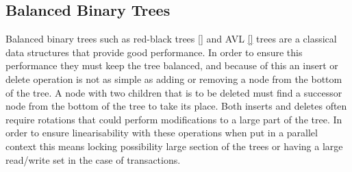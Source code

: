 \documentclass[10pt]{sigplanconf}
\begin{document}
%
%
%
%
%
%



\subsection*{Balanced Binary Trees}
Balanced binary trees such as red-black trees \ref{} and AVL \ref{} trees are a classical data structures that provide good performance.
In order to ensure this performance they must keep the tree balanced, and because of this an insert or delete operation is not as simple as adding or removing a node from the bottom of the tree.
A node with two children that is to be deleted must find a successor node from the bottom of the tree to take its place.
Both inserts and deletes often require rotations that could perform modifications to a large part of the tree.
In order to ensure linearisability with these operations when put in a parallel context this means locking possibility large section of the trees or having a large read/write set in the case of transactions.
\end{document}
